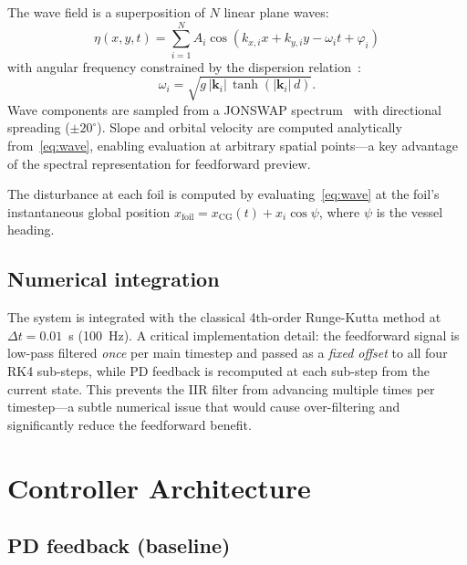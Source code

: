 \documentclass[review]{elsarticle}
\begin{document}
The wave field is a superposition of $N$ linear plane waves:
\begin{equation}
  \eta(x, y, t) = \sum_{i=1}^{N} A_i \cos(k_{x,i} x + k_{y,i} y - \omega_i t + \varphi_i)
  \label{eq:wave}
\end{equation}
with angular frequency constrained by the dispersion
relation~\citep{holthuijsen2007}:
\begin{equation}
  \omega_i = \sqrt{g\,|\mathbf{k}_i|\,\tanh(|\mathbf{k}_i|\,d)}.
  \label{eq:dispersion}
\end{equation}
Wave components are sampled from a JONSWAP
spectrum~\citep{hasselmann1973} with directional spreading
($\pm 20^\circ$).
Slope and orbital velocity are computed analytically
from~\eqref{eq:wave}, enabling evaluation at arbitrary
spatial points---a key advantage of the spectral
representation for feedforward preview.

The disturbance at each foil is computed by evaluating~\eqref{eq:wave}
at the foil's instantaneous global position
$x_{\text{foil}} = x_{\text{CG}}(t) + x_i \cos\psi$,
where $\psi$ is the vessel heading.

\subsection{Numerical integration}

The system is integrated with the classical 4th-order Runge-Kutta method
at $\Delta t = 0.01$~s (100~Hz).
A critical implementation detail: the feedforward signal is low-pass
filtered \emph{once} per main timestep and passed as a \emph{fixed offset}
to all four RK4 sub-steps, while PD feedback is recomputed at each
sub-step from the current state.
This prevents the IIR filter from advancing multiple times per
timestep---a subtle numerical issue that would cause over-filtering and
significantly reduce the feedforward benefit.

\section{Controller Architecture}
\label{sec:controller}

\subsection{PD feedback (baseline)}
\end{document}
